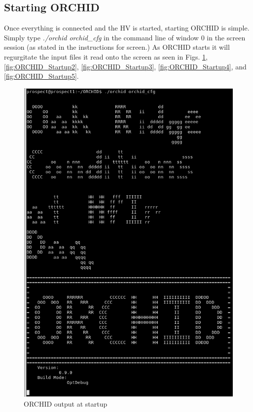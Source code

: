 \documentclass[onecolumn, 10pt, letterpaper, twoside]{article}
\begin{document}
\subsection{Starting ORCHID}
Once everything is connected and the HV is started, starting ORCHID is simple. Simply type \emph{./orchid orchid\_cfg} in the command line of window 0 in the screen session (as stated in the instructions for screen.) As ORCHID starts it will regurgitate the input files it read onto the screen as seen in Figs. \ref{fig:ORCHID_Startup1}, \ref{fig:ORCHID_Startup2}, \ref{fig:ORCHID_Startup3}, \ref{fig:ORCHID_Startup4}, and \ref{fig:ORCHID_Startup5}.
\begin{figure}[h!]
\begin{center}
\includegraphics[width=\textwidth]{./img/Start_Screen_1.png}
\caption{ORCHID output at startup}
\label{fig:ORCHID_Startup1}
\end{center}
\end{figure}
\end{document}
